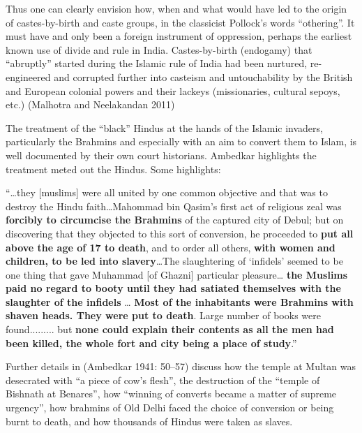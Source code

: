 Thus one can clearly envision how, when and what would have led to the origin of castes-by-birth and caste groups, in the classicist Pollock's words “othering”. It must have and only been a foreign instrument of oppression, perhaps the earliest known use of divide and rule in India. Castes-by-birth (endogamy) that “abruptly” started during the Islamic rule of India had been nurtured, re-engineered and corrupted further into casteism and untouchability by the British and European colonial powers and their lackeys (missionaries, cultural sepoys, etc.) (Malhotra and Neelakandan 2011)

The treatment of the “black” Hindus at the hands of the Islamic invaders, particularly the Brahmins and especially with an aim to convert them to Islam, is well documented by their own court historians. Ambedkar highlights the treatment meted out the Hindus. Some highlights:

\begin{myquote}
“…they [muslims] were all united by one common objective and that was to destroy the Hindu faith…Mahommad bin Qasim's first act of religious zeal was \textbf{forcibly to circumcise the Brahmins} of the captured city of Debul; but on discovering that they objected to this sort of conversion, he proceeded to \textbf{put all above the age of 17 to death}, and to order all others, \textbf{with women and children, to be led into slavery}…The slaughtering of ‘infidels’ seemed to be one thing that gave Muhammad [of Ghazni] particular pleasure… \textbf{the Muslims paid no regard to booty until they had satiated themselves with the slaughter of the infidels} … \textbf{Most of the inhabitants were Brahmins with shaven heads. They were put to death}. Large number of books were found......... but \textbf{none could explain their contents as all the men had been killed, the whole fort and city being a place of study}.”
\end{myquote}

Further details in (Ambedkar 1941: 50–57) discuss how the temple at Multan was desecrated with “a piece of cow’s flesh”, the destruction of the “temple of Bishnath at Benares”, how “winning of converts became a matter of supreme urgency”, how brahmins of Old Delhi faced the choice of conversion or being burnt to death, and how thousands of Hindus were taken as slaves.

